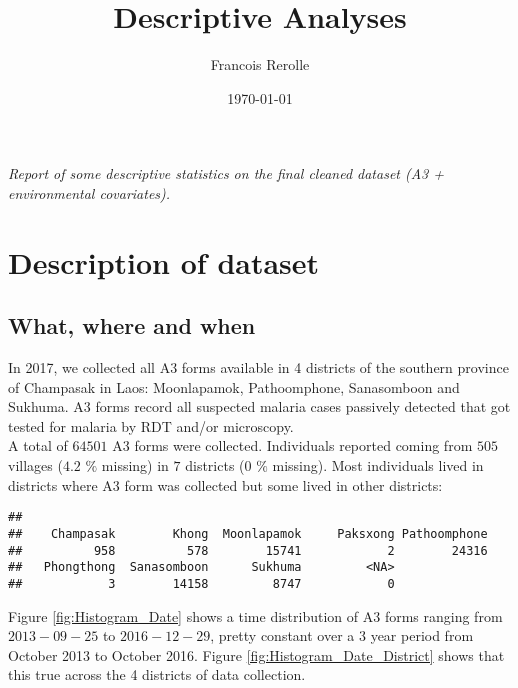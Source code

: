 \documentclass{article}\usepackage[]{graphicx}\usepackage[]{color}
\title{Descriptive Analyses}
\author{Francois Rerolle}
\date{\today}
\makeatletter
\newenvironment{kframe}{%
 \def\at@end@of@kframe{}%
 \ifinner\ifhmode%
  \def\at@end@of@kframe{\end{minipage}}%
  \begin{minipage}{\columnwidth}%
 \fi\fi%
 \def\FrameCommand##1{\hskip\@totalleftmargin \hskip-\fboxsep
 \colorbox{shadecolor}{##1}\hskip-\fboxsep
     \hskip-\linewidth \hskip-\@totalleftmargin \hskip\columnwidth}%
 \MakeFramed {\advance\hsize-\width
   \@totalleftmargin\z@ \linewidth\hsize
   \@setminipage}}%
 {\par\unskip\endMakeFramed%
 \at@end@of@kframe}
\newenvironment{knitrout}{}{} %
\makeatother
\begin{document}
\maketitle
 

\noindent \textit{Report of some descriptive statistics on the final cleaned dataset (A3 + environmental covariates).}


\section{Description of dataset}
\subsection{What, where and when}
In 2017, we collected all A3 forms available in 4 districts of the southern province of Champasak in Laos: Moonlapamok, Pathoomphone, Sanasomboon and Sukhuma. A3 forms record all suspected malaria cases passively detected that got tested for malaria by RDT and/or microscopy.\\

\noindent A total of \(64501\) A3 forms were collected. Individuals reported coming from \(505\) villages (\(4.2\) $\%$ missing) in \(7\) districts (\(0\) $\%$ missing). Most individuals lived in districts where A3 form was collected but some lived in other districts:\\

\begin{knitrout}
\color{fgcolor}\begin{kframe}
\begin{verbatim}
## 
##    Champasak        Khong  Moonlapamok     Paksxong Pathoomphone 
##          958          578        15741            2        24316 
##   Phongthong  Sanasomboon      Sukhuma         <NA> 
##            3        14158         8747            0
\end{verbatim}
\end{kframe}
\end{knitrout}

\noindent Figure \ref{fig:Histogram_Date} shows a time distribution of A3 forms ranging from \(2013-09-25\) to \(2016-12-29\), pretty constant over a 3 year period from October 2013 to October 2016. Figure \ref{fig:Histogram_Date_District} shows that this true across the 4 districts of data collection.
\end{document}
